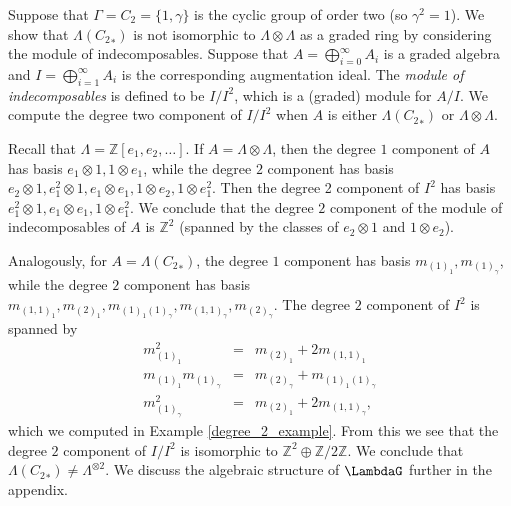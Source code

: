 \begin{example}
Suppose that $\Gamma = C_2 = \{1, \gamma\}$ is the cyclic group of order two (so $\gamma^2=1$). We show that $\Lambda({C_2}_*)$ is not isomorphic to $\Lambda \otimes \Lambda$ as a graded ring by considering the module of indecomposables. Suppose that $A = \bigoplus_{i=0}^\infty A_i$ is a graded algebra and $I = \bigoplus_{i=1}^\infty A_i$ is the corresponding augmentation ideal. The \emph{module of indecomposables} is defined to be $I/I^2$, which is a (graded) module for $A/I$. We compute the degree two component of $I/I^2$ when $A$ is either $\Lambda({C_2}_*)$ or $\Lambda \otimes \Lambda$.

Recall that $\Lambda = \mathbb{Z}[e_1, e_2, \ldots]$. If $A = \Lambda \otimes \Lambda$, then the degree $1$ component of $A$ has basis $e_1 \otimes 1, 1 \otimes e_1$, while the degree $2$ component has basis $e_2 \otimes 1, e_1^2 \otimes 1, e_1 \otimes e_1, 1 \otimes e_2, 1 \otimes e_1^2$. Then the degree 2 component of $I^2$ has basis $e_1^2 \otimes 1, e_1 \otimes e_1, 1 \otimes e_1^2$. We conclude that the degree $2$ component of the module of indecomposables of $A$ is $\mathbb{Z}^2$ (spanned by the classes of $e_2 \otimes 1$ and $1 \otimes e_2$).

Analogously, for $A = \Lambda({C_2}_*)$, the degree $1$ component has basis $m_{(1)_1}, m_{(1)_\gamma}$, while the degree $2$ component has basis $m_{(1,1)_1}, m_{(2)_1}, m_{(1)_1 (1)_\gamma}, m_{(1,1)_\gamma}, m_{(2)_\gamma}$. The degree $2$ component of $I^2$ is spanned by 
\begin{eqnarray*}
m_{(1)_1}^2 &=& m_{(2)_1} + 2m_{(1,1)_1} \\
m_{(1)_1}m_{(1)_\gamma} &=&  m_{(2)_\gamma} + m_{(1)_1 (1)_\gamma} \\
m_{(1)_\gamma}^2 &=& m_{(2)_1} + 2 m_{(1,1)_\gamma},
\end{eqnarray*}
which we computed in Example \ref{degree_2_example}. From this we see that the degree $2$ component of $I/I^2$ is isomorphic to $\mathbb{Z}^{2} \oplus \mathbb{Z}/2\mathbb{Z}$. We conclude that $\Lambda({C_2}_*) \neq \Lambda^{\otimes 2}$. We discuss the algebraic structure of $\LambdaG$ further in the appendix.
\end{example}



